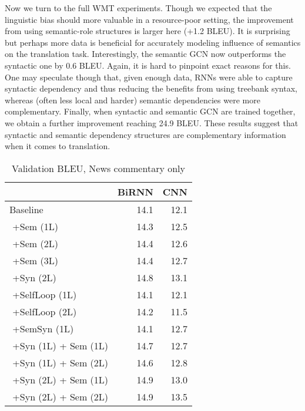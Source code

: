 \documentclass[11pt,a4paper]{article}
\begin{document}
Now we turn to the full WMT experiments. 
Though we expected that the linguistic bias should more valuable in a resource-poor setting, the improvement from using semantic-role structures is larger here (+1.2 BLEU). 
It is surprising but perhaps more data is beneficial for accurately modeling influence of semantics on the translation task. 
Interestingly, the semantic GCN now outperforms the syntactic one by 0.6 BLEU. Again, it is hard to pinpoint exact reasons for this. One may speculate though that, given enough data, RNNs were able to capture syntactic dependency and thus reducing the benefits from using treebank syntax,  whereas (often less local and harder) semantic dependencies were more complementary. 
Finally, when syntactic and semantic GCN are trained together, we obtain a further improvement reaching 24.9 BLEU.
These results suggest that syntactic and semantic dependency structures are complementary information when it comes to translation.

\begin{table}[h]
\centering
\begin{tabular}{@{}lrr@{}} 
\toprule
& BiRNN & CNN \\
\midrule
Baseline \small{\cite{bastings-EtAl:2017:EMNLP2017}}	& 14.1 & 12.1\\
\midrule
\,\,+Sem (1L)	& 14.3 & 12.5\\
\,\,+Sem (2L)	& 14.4 &12.6\\
\,\,+Sem (3L)	& 14.4	&12.7\\
\,\,+Syn (2L) \small{\cite{bastings-EtAl:2017:EMNLP2017}} & 14.8 & 13.1\\
\midrule
\,\,+SelfLoop (1L)			& 14.1	& 12.1 \\
\,\,+SelfLoop (2L)			& 14.2	& 11.5\\
\toprule
\,\,+SemSyn (1L)			& 14.1	& 12.7	\\
\,\,+Syn (1L) + Sem (1L)	& 14.7	& 12.7\\
\,\,+Syn (1L) + Sem (2L)	& 14.6	& 12.8 \\
\,\,+Syn (2L) + Sem (1L)	& 14.9	& 13.0	 \\
\,\,+Syn (2L) + Sem (2L)	& 14.9 & 13.5\\
\bottomrule
\end{tabular}
\caption{Validation BLEU, News commentary only}
\label{tab:dev-ende}
\end{table}
\end{document}
